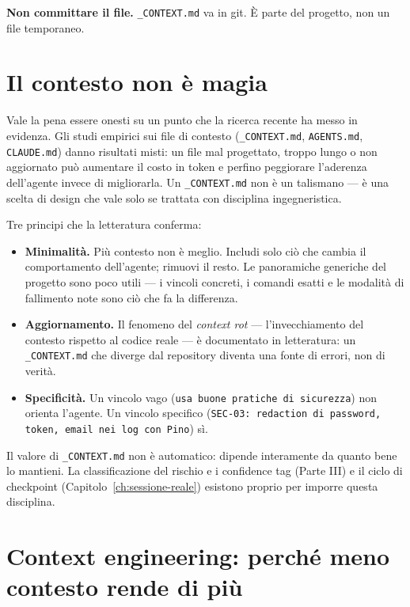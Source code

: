 \textbf{Non committare il file.} \texttt{\_CONTEXT.md} va in git. È parte del progetto, non un file temporaneo.

\section{Il contesto non è magia}
\label{sec:04-non-magia}

Vale la pena essere onesti su un punto che la ricerca recente ha messo in evidenza. Gli studi empirici sui file di contesto (\texttt{\_CONTEXT.md}, \texttt{AGENTS.md}, \texttt{CLAUDE.md}) danno risultati misti: un file mal progettato, troppo lungo o non aggiornato può aumentare il costo in token e perfino peggiorare l'aderenza dell'agente invece di migliorarla. Un \texttt{\_CONTEXT.md} non è un talismano --- è una scelta di design che vale solo se trattata con disciplina ingegneristica.

Tre principi che la letteratura conferma:

\begin{itemize}
  \item \textbf{Minimalità.} Più contesto non è meglio. Includi solo ciò che cambia il comportamento dell'agente; rimuovi il resto. Le panoramiche generiche del progetto sono poco utili --- i vincoli concreti, i comandi esatti e le modalità di fallimento note sono ciò che fa la differenza.
  \item \textbf{Aggiornamento.} Il fenomeno del \textit{context rot} --- l'invecchiamento del contesto rispetto al codice reale --- è documentato in letteratura: un \texttt{\_CONTEXT.md} che diverge dal repository diventa una fonte di errori, non di verità.
  \item \textbf{Specificità.} Un vincolo vago (\texttt{usa buone pratiche di sicurezza}) non orienta l'agente. Un vincolo specifico (\texttt{SEC-03: redaction di password, token, email nei log con Pino}) sì.
\end{itemize}

Il valore di \texttt{\_CONTEXT.md} non è automatico: dipende interamente da quanto bene lo mantieni. La classificazione del rischio e i confidence tag (Parte III) e il ciclo di checkpoint (Capitolo~\ref{ch:sessione-reale}) esistono proprio per imporre questa disciplina.

\section{Context engineering: perché meno contesto rende di più}
\label{sec:04-context-engineering}

